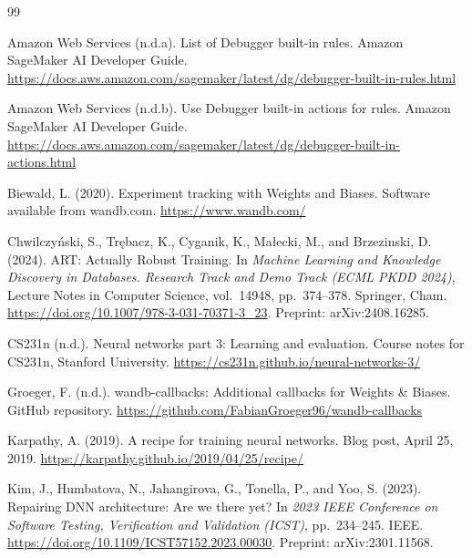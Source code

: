 \begin{thebibliography}{99}

Amazon Web Services (n.d.a).
\newblock List of Debugger built-in rules.
\newblock Amazon SageMaker AI Developer Guide.
\newblock \url{https://docs.aws.amazon.com/sagemaker/latest/dg/debugger-built-in-rules.html}

Amazon Web Services (n.d.b).
\newblock Use Debugger built-in actions for rules.
\newblock Amazon SageMaker AI Developer Guide.
\newblock \url{https://docs.aws.amazon.com/sagemaker/latest/dg/debugger-built-in-actions.html}

Biewald, L. (2020).
\newblock Experiment tracking with Weights and Biases.
\newblock Software available from wandb.com.
\newblock \url{https://www.wandb.com/}

Chwilczy\'nski, S., Tr\k{e}bacz, K., Cyganik, K., Ma\l{}ecki, M., and Brzezinski, D. (2024).
\newblock ART: Actually Robust Training.
\newblock In \emph{Machine Learning and Knowledge Discovery in Databases. Research Track and Demo Track (ECML PKDD 2024)}, Lecture Notes in Computer Science, vol.~14948, pp.~374--378. Springer, Cham.
\newblock \url{https://doi.org/10.1007/978-3-031-70371-3_23}. Preprint: arXiv:2408.16285.

CS231n (n.d.).
\newblock Neural networks part 3: Learning and evaluation.
\newblock Course notes for CS231n, Stanford University.
\newblock \url{https://cs231n.github.io/neural-networks-3/}

Groeger, F. (n.d.).
\newblock wandb-callbacks: Additional callbacks for Weights \& Biases.
\newblock GitHub repository.
\newblock \url{https://github.com/FabianGroeger96/wandb-callbacks}

Karpathy, A. (2019).
\newblock A recipe for training neural networks.
\newblock Blog post, April 25, 2019.
\newblock \url{https://karpathy.github.io/2019/04/25/recipe/}

Kim, J., Humbatova, N., Jahangirova, G., Tonella, P., and Yoo, S. (2023).
\newblock Repairing DNN architecture: Are we there yet?
\newblock In \emph{2023 IEEE Conference on Software Testing, Verification and Validation (ICST)}, pp.~234--245. IEEE.
\newblock \url{https://doi.org/10.1109/ICST57152.2023.00030}. Preprint: arXiv:2301.11568.


\end{thebibliography}
